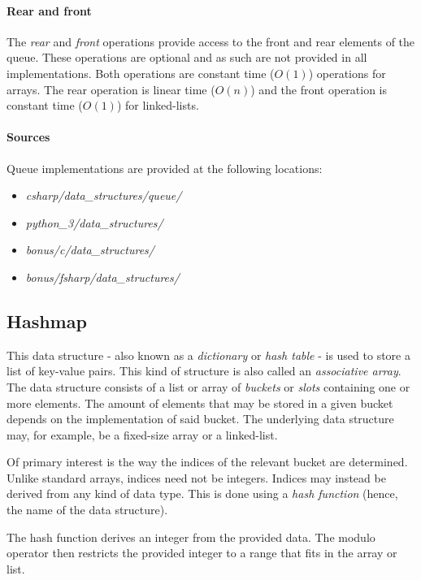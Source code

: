 \documentclass{article}
\begin{document}
\paragraph{Rear and front}
The {\em rear} and {\em front} operations provide access to the front and rear elements of the queue.
These operations are optional and as such are not provided in all implementations.
Both operations are constant time (\(O(1)\)) operations for arrays.
The rear operation is linear time (\(O(n)\)) and the front operation is constant time (\(O(1)\)) for linked-lists.

\paragraph{Sources}
Queue implementations are provided at the following locations:
\begin{itemize}
\item{{\em csharp/data\_structures/queue/}}
\item{{\em python\_3/data\_structures/}}
\item{{\em bonus/c/data\_structures/}}
\item{{\em bonus/fsharp/data\_structures/}}
\end{itemize}


\newpage


\subsection{Hashmap}
This data structure - also known as a {\em dictionary} or {\em hash table} -
is used to store a list of key-value pairs. This kind of structure is also called an {\em associative array}.
The data structure consists of a list or array of {\em buckets} or {\em slots} containing one or
more elements. The amount of elements that may be stored in a given bucket depends on the implementation of said
bucket. The underlying data structure may, for example, be a fixed-size array or a linked-list.

Of primary interest is the way the indices of the relevant bucket are determined.
Unlike standard arrays, indices need not be integers. Indices may instead be derived from any kind of data type.
This is done using a {\em hash function} (hence, the name of the data structure).

The hash function derives an integer from the provided data. The modulo operator then restricts the provided
integer to a range that fits in the array or list.
\end{document}
